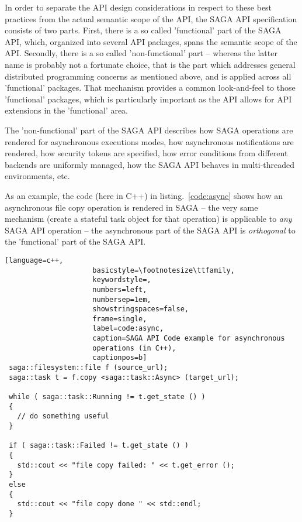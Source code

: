 \documentclass[a4paper,12pt]{article}
\newcommand{\I}[1]{\textit{#1}}
\begin{document}
  In order to separate the API design considerations in respect to
  these best practices from the actual semantic scope of the API, the
  SAGA API specification consists of two parts.  First, there is a so
  called 'functional' part of the SAGA API, which, organized into
  several API packages, spans the semantic scope of the API.
  Secondly, there is a so called 'non-functional' part -- whereas the
  latter name is probably not a fortunate choice, that is the part
  which addresses general distributed programming concerns as
  mentioned above, and is applied across all 'functional' packages.
  That mechanism provides a common look-and-feel to those 'functional'
  packages, which is particularly important as the API allows for API
  extensions in the 'functional' area.

  The 'non-functional' part of the SAGA API describes how SAGA
  operations are rendered for asynchronous executions modes, how
  asynchronous notifications are rendered, how security tokens are
  specified, how error conditions from different backends are
  uniformly managed, how the SAGA API behaves in multi-threaded
  environments, etc.

  As an example, the code (here in C++) in listing.~\ref{code:async}
  shows how an asynchronous file copy operation is rendered in SAGA --
  the very same mechanism (create a stateful task object for that
  operation) is applicable to \I{any} SAGA API operation -- the
  asynchronous part of the SAGA API is \I{orthogonal} to the
  'functional' part of the SAGA API.\\

  \begin{lstlisting}[language=c++,
                     basicstyle=\footnotesize\ttfamily,
                     keywordstyle=,
                     numbers=left,
                     numbersep=1em,
                     showstringspaces=false,
                     frame=single, 
                     label=code:async,
                     caption=SAGA API Code example for asynchronous
                     operations (in C++),
                     captionpos=b]
 saga::filesystem::file f (source_url);
 saga::task t = f.copy <saga::task::Async> (target_url);

 while ( saga::task::Running != t.get_state () )
 {
   // do something useful
 }

 if ( saga::task::Failed != t.get_state () )
 {
   std::cout << "file copy failed: " << t.get_error ();
 } 
 else
 {
   std::cout << "file copy done " << std::endl;
 }
  \end{lstlisting}
\end{document}
